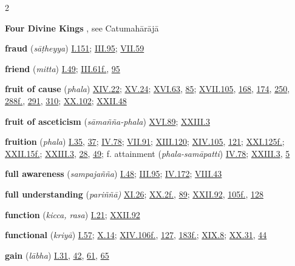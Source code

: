 \begin{multicols}{2}
\begin{vismHanging}
\par\textbf{Four Divine Kings} , see Catumahārājā
\par\textbf{fraud} (\emph{sāṭheyya}) \hyperlink{I.151}{I.151}{}; \hyperlink{III.95}{III.95}{}; \hyperlink{VII.59}{VII.59}{}
\par\textbf{friend} (\emph{mitta}) \hyperlink{I.49}{I.49}{}; \hyperlink{III.61}{III.61f.}{}, \hyperlink{III.95}{95}{}
\par\textbf{fruit of cause} (\emph{phala}) \hyperlink{XIV.22}{XIV.22}{}; \hyperlink{XV.24}{XV.24}{}; \hyperlink{XVI.63}{XVI.63}{}, \hyperlink{XVI.85}{85}{}; \hyperlink{XVII.105}{XVII.105}{}, \hyperlink{XVII.168}{168}{}, \hyperlink{XVII.174}{174}{}, \hyperlink{XVII.250}{250}{}, \hyperlink{XVII.288}{288f.}{}, \hyperlink{XVII.291}{291}{}, \hyperlink{XVII.310}{310}{}; \hyperlink{XX.102}{XX.102}{}; \hyperlink{XXII.48}{XXII.48}{}
\par\textbf{fruit of asceticism} (\emph{sāmañña-phala}) \hyperlink{XVI.89}{XVI.89}{}; \hyperlink{XXIII.3}{XXIII.3}{}
\par\textbf{fruition} (\emph{phala}) \hyperlink{I.35}{I.35}{}, \hyperlink{I.37}{37}{}; \hyperlink{IV.78}{IV.78}{}; \hyperlink{VII.91}{VII.91}{}; \hyperlink{XIII.120}{XIII.120}{}; \hyperlink{XIV.105}{XIV.105}{}, \hyperlink{XIV.121}{121}{}; \hyperlink{XXI.125}{XXI.125f.}{}; \hyperlink{XXII.15}{XXII.15f.}{}; \hyperlink{XXIII.3}{XXIII.3}{}, \hyperlink{XXIII.28}{28}{}, \hyperlink{XXIII.49}{49}{}; f. attainment (\emph{phala-samāpatti}) \hyperlink{IV.78}{IV.78}{}; \hyperlink{XXIII.3}{XXIII.3}{}, \hyperlink{XXIII.5}{5}{}
\par\textbf{full awareness} (\emph{sampajañña}) \hyperlink{I.48}{I.48}{}; \hyperlink{III.95}{III.95}{}; \hyperlink{IV.172}{IV.172}{}; \hyperlink{VIII.43}{VIII.43}{}
\par\textbf{full understanding} (\emph{pariññā) }\hyperlink{XI.26}{XI.26}{}; \hyperlink{XX.2}{XX.2f.}{}, \hyperlink{XX.89}{89}{}; \hyperlink{XXII.92}{XXII.92}{}, \hyperlink{XXII.105}{105f.}{}, \hyperlink{XXII.128}{128}{}
\par\textbf{function} (\emph{kicca, rasa}) \hyperlink{I.21}{I.21}{}; \hyperlink{XXII.92}{XXII.92}{}
\par\textbf{functional} (\emph{kriyā}) \hyperlink{I.57}{I.57}{}; \hyperlink{X.14}{X.14}{}; \hyperlink{XIV.106}{XIV.106f.}{}, \hyperlink{XIV.127}{127}{}, \hyperlink{XIV.183}{183f.}{}; \hyperlink{XIX.8}{XIX.8}{}; \hyperlink{XX.31}{XX.31}{}, \hyperlink{XX.44}{44}{}
\par\textbf{gain} (\emph{lābha}) \hyperlink{I.31}{I.31}{}, \hyperlink{I.42}{42}{}, \hyperlink{I.61}{61}{}, \hyperlink{I.65}{65}{}

\end{vismHanging}
\end{multicols}
